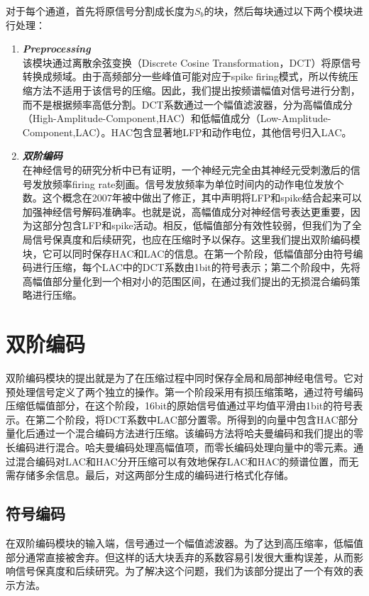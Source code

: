 对于每个通道，首先将原信号分割成长度为$S_b$的块，然后每块通过以下两个模块进行处理：\\
\begin{enumerate}[\sffamily a.]
\item{\textbf{\textit{Preprocessing}}}\\
该模块通过离散余弦变换（Discrete Cosine Transformation，DCT）将原信号转换成频域。由于高频部分一些峰值可能对应于spike firing模式，所以传统压缩方法不适用于该信号的压缩。因此，我们提出按频谱幅值对信号进行分割，而不是根据频率高低分割。DCT系数通过一个幅值滤波器，分为高幅值成分（High-Amplitude-Component,HAC）和低幅值成分（Low-Amplitude-Component,LAC）。HAC包含显著地LFP和动作电位，其他信号归入LAC。 
 
\item{\textbf{\textit{双阶编码}}}\\
在神经信号的研究分析中已有证明，一个神经元完全由其神经元受刺激后的信号发放频率firing rate刻画\cite{32}。信号发放频率为单位时间内的动作电位发放个数。这个概念在2007年被\cite{3}中做出了修正，其中声明将LFP和spike结合起来可以加强神经信号解码准确率。也就是说，高幅值成分对神经信号表达更重要，因为这部分包含LFP和spike活动。相反，低幅值部分有效性较弱，但我们为了全局信号保真度和后续研究，也应在压缩时予以保存。这里我们提出双阶编码模块，它可以同时保存HAC和LAC的信息。在第一个阶段，低幅值部分由符号编码进行压缩，每个LAC中的DCT系数由1bit的符号表示；第二个阶段中，先将高幅值部分量化到一个相对小的范围区间，在通过我们提出的无损混合编码策略进行压缩。
\end{enumerate}









\section{双阶编码}
双阶编码模块的提出就是为了在压缩过程中同时保存全局和局部神经电信号。它对预处理信号定义了两个独立的操作。第一个阶段采用有损压缩策略，通过符号编码压缩低幅值部分，在这个阶段，16bit的原始信号值通过平均值平滑由1bit的符号表示。在第二个阶段，将DCT系数中LAC部分置零。所得到的向量中包含HAC部分量化后通过一个混合编码方法进行压缩。该编码方法将哈夫曼编码和我们提出的零长编码进行混合。哈夫曼编码处理高幅值项，而零长编码处理向量中的零元素。通过混合编码对LAC和HAC分开压缩可以有效地保存LAC和HAC的频谱位置，而无需存储多余信息。最后，对这两部分生成的编码进行格式化存储。
 
 
 
\subsection{符号编码}
\label{sec:symbol_encoding}
在双阶编码模块的输入端，信号通过一个幅值滤波器。为了达到高压缩率，低幅值部分通常直接被舍弃。但这样的话大块丢弃的系数容易引发很大重构误差，从而影响信号保真度和后续研究。为了解决这个问题，我们为该部分提出了一个有效的表示方法。

